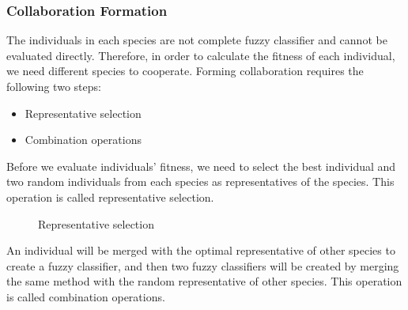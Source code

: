 \documentclass[conference,compsoc]{IEEEtran}
\begin{document}
\subsubsection{Collaboration Formation}
The individuals in each species are not complete fuzzy classifier and cannot be evaluated directly. Therefore, in order to calculate the fitness of each individual, we need different species to cooperate. Forming collaboration requires the following two steps:
\begin{itemize}
	\item Representative selection 
	\item Combination operations
\end{itemize}
Before we evaluate individuals' fitness, we need to select the best individual and two random individuals from each species as representatives of the species. This operation is called representative selection.\\
\begin{figure}[htbp]%
	\centering
	\caption{Representative selection}
	\label{selection.png} 
\end{figure}
An individual will be merged with the optimal representative of other species to create a fuzzy classifier, and then two fuzzy classifiers will be created by merging the same method with the random representative of other species. This operation is called combination operations.\\
\end{document}
